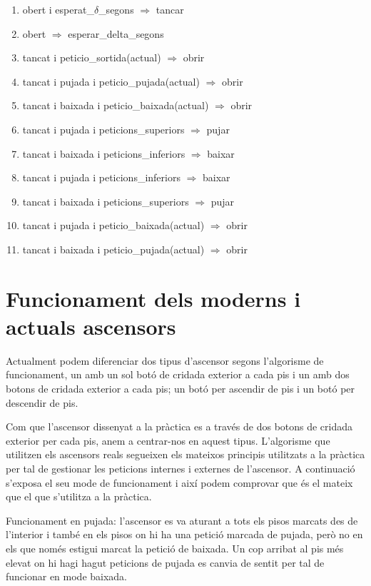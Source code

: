 \documentclass[a4paper, 11pt]{article}
\begin{document}
\begin{enumerate}
\item obert i esperat\_$\delta$\_segons $\Rightarrow$ tancar
\item obert $\Rightarrow$ esperar\_delta\_segons
\item tancat i peticio\_sortida(actual) $\Rightarrow$ obrir
\item tancat i pujada i peticio\_pujada(actual) $\Rightarrow$ obrir
\item tancat i baixada i peticio\_baixada(actual) $\Rightarrow$ obrir
\item tancat i pujada i peticions\_superiors $\Rightarrow$ pujar
\item tancat i baixada i peticions\_inferiors $\Rightarrow$ baixar
\item tancat i pujada i peticions\_inferiors $\Rightarrow$ baixar
\item tancat i baixada i peticions\_superiors $\Rightarrow$ pujar
\item tancat i pujada i peticio\_baixada(actual) $\Rightarrow$ obrir
\item tancat i baixada i peticio\_pujada(actual) $\Rightarrow$ obrir
\end{enumerate}

\section{Funcionament dels moderns i actuals ascensors}
Actualment podem diferenciar dos tipus d'ascensor segons l'algorisme de 
funcionament, un amb un sol botó de cridada exterior a cada pis i un amb dos 
botons de cridada exterior a cada pis; un botó per ascendir de pis i un botó per 
descendir de pis.

Com que l'ascensor dissenyat a la pràctica es a través de dos botons de cridada 
exterior per cada pis, anem a centrar-nos en aquest tipus. L'algorisme que 
utilitzen els ascensors reals segueixen els mateixos principis utilitzats a la 
pràctica per tal de gestionar les peticions internes i externes de l'ascensor. A 
continuació s'exposa el seu mode de funcionament i així podem comprovar que és 
el mateix que el que s'utilitza a la pràctica.

Funcionament en pujada: l'ascensor es va aturant a tots els pisos marcats des de 
l'interior i també en els pisos on hi ha una petició marcada de pujada, però no 
en els que només estigui marcat la petició de baixada. Un cop arribat al pis més 
elevat on hi hagi hagut peticions de pujada es canvia de sentit per tal de 
funcionar en mode baixada.
\end{document}

